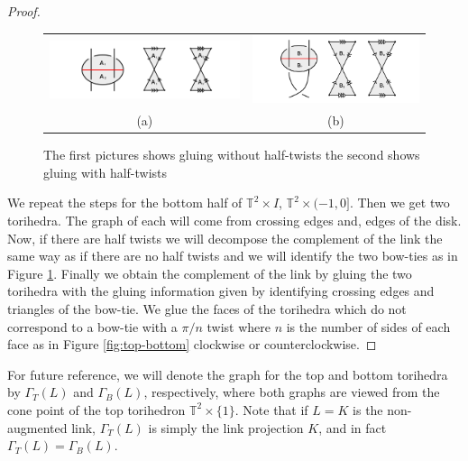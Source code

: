 \documentclass[11pt]{amsart}
\newcommand{\torus}{{\mathbb{T}^2}}
\theoremstyle{plain}
\theoremstyle{definition}
\begin{document}
\begin{proof}
\begin{figure}
 \centering
 \begin{tabular}{cc}
 \includegraphics [width=8cm]{falGluing1}&
 \includegraphics [width=7cm]{falGluing2}\\
 (a)&(b)
 \end{tabular}
 \caption{The first pictures shows gluing without half-twists the second shows gluing with half-twists}
 \label{fig:falGluings}
 \end{figure}

\indent We repeat the steps for the bottom half of $\torus \times I$, $\torus \times
(-1,0]$. Then we get two torihedra. The graph of each will come from
crossing edges and, edges of the disk. Now, if there are half twists we will
decompose the complement of the link the same way as if there are no half twists
and we will identify the two bow-ties as in Figure \ref{fig:falGluings}. Finally
we obtain the complement of the link by gluing the two torihedra with the gluing
information given by identifying crossing edges and triangles of the bow-tie. We
glue the faces of the torihedra which do not correspond to a bow-tie with a
$\pi/n$ twist where $n$ is the number of sides of each face as in Figure
\ref{fig:top-bottom} clockwise or counterclockwise.

\end{proof}

For future reference, we will denote the graph for the top and bottom
torihedra by $\Gamma_T(L)$ and $\Gamma_B(L)$, respectively,
where both graphs are viewed from the cone point of the top torihedron
$\torus \times \{1\}$.
Note that if $L = K$ is the non-augmented link,
$\Gamma_T(L)$ is simply the link projection $K$,
and in fact $\Gamma_T(L) = \Gamma_B(L)$.
\end{document}
